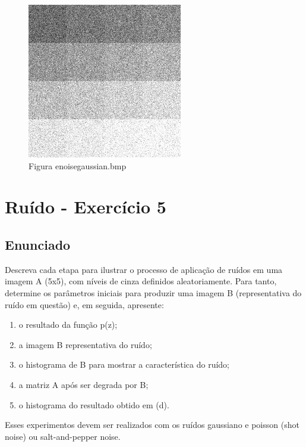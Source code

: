 \documentclass[10pt,a4paper]{article}
\begin{document}
\begin{enumerate}[label=\roman*.]
\begin{figure}[H]
    \centering
    \includegraphics[scale=0.9]{images_generate/03/e_noise_gaussian.jpg}
    \caption{Figura e\textunderscore noise\textunderscore gaussian.bmp}
    \label{fig:enoisegausian}
\end{figure}

\end{enumerate}

\pagebreak

\section{Ruído - Exercício 5}

\subsection{Enunciado}

Descreva cada etapa para ilustrar o processo de aplicação de ruídos em uma imagem A (5x5), com níveis de cinza definidos aleatoriamente. Para tanto, determine os parâmetros
iniciais para produzir uma imagem B (representativa do ruído em questão) e, em seguida, apresente: 

\begin{enumerate}[label=\alph*.]
   \item o resultado da função p(z);
   \item a imagem B representativa do ruído;
   \item o histograma de B para mostrar a característica do ruído;
   \item a matriz A após ser degrada por B;
   \item o histograma do resultado obtido em (d).
\end{enumerate}

 Esses experimentos devem ser realizados com os ruídos gaussiano e poisson (shot noise) ou salt-and-pepper noise.
\end{document}
